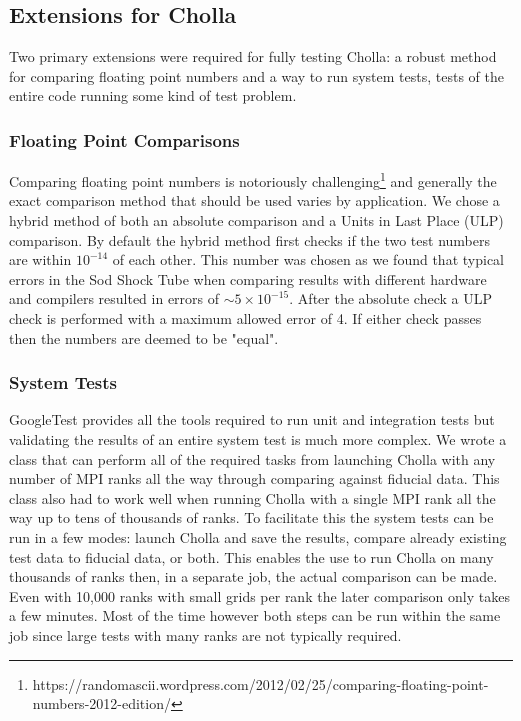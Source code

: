\subsection{Extensions for Cholla}

Two primary extensions were required for fully testing Cholla: a robust method for comparing floating point numbers and a way to run system tests, tests of the entire code running some kind of test problem.

\subsubsection{Floating Point Comparisons}

Comparing floating point numbers is notoriously challenging\footnote{https://randomascii.wordpress.com/2012/02/25/comparing-floating-point-numbers-2012-edition/} and generally the exact comparison method that should be used varies by application. We chose a hybrid method of both an absolute comparison and a Units in Last Place (ULP) comparison. By default the hybrid method first checks if the two test numbers are within $10^{-14}$ of each other. This number was chosen as we found that typical errors in the Sod Shock Tube when comparing results with different hardware and compilers resulted in errors of $\sim5\times10^{-15}$. After the absolute check a ULP check is performed with a maximum allowed error of 4. If either check passes then the numbers are deemed to be "equal".

\subsubsection{System Tests}

GoogleTest provides all the tools required to run unit and integration tests but validating the results of an entire system test is much more complex. We wrote a class that can perform all of the required tasks from launching Cholla with any number of MPI ranks all the way through comparing against fiducial data. This class also had to work well when running Cholla with a single MPI rank all the way up to tens of thousands of ranks. To facilitate this the system tests can be run in a few modes: launch Cholla and save the results, compare already existing test data to fiducial data, or both. This enables the use to run Cholla on many thousands of ranks then, in a separate job, the actual comparison can be made. Even with 10,000 ranks with small grids per rank the later comparison only takes a few minutes. Most of the time however both steps can be run within the same job since large tests with many ranks are not typically required.

